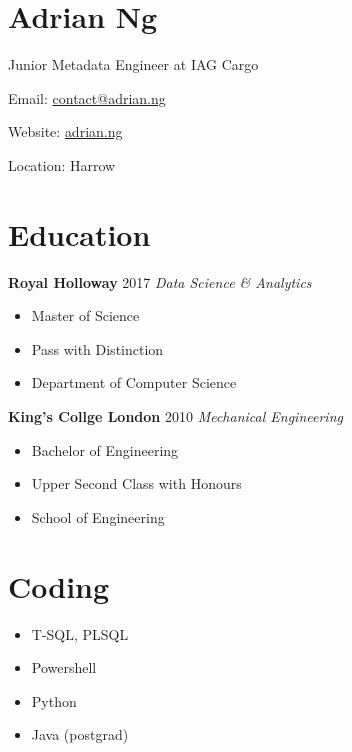 \documentclass[../cv.tex]{subfiles}
\begin{document}
\section{Adrian Ng}
Junior Metadata Engineer at IAG Cargo
\hfill
\begin{description*}
	\item[Email:] \href{mailto:contact@adrian.ng}{contact@adrian.ng}
	\item[Website:] \href{https://adrian.ng}{adrian.ng}
	\item[Location:] Harrow
\end{description*}
\hfill
\vspace{0.25cm}
\noindent
\newline
\begin{minipage}[t]{0.6\linewidth}
	\section{Education}
	\begin{minipage}[t]{0.5\linewidth}
		\textbf{Royal Holloway} \hfill 2017
		\newline
		\textit{Data Science \& Analytics}
		\begin{itemize}[leftmargin=*, itemsep=0.1em]
			\item	Master of Science
			\item	Pass with Distinction
			\item 	Department of Computer Science
		\end{itemize}
	\end{minipage}
	\hspace{0.2em}
	\begin{minipage}[t]{0.5\linewidth}
		\textbf{King's Collge London} \hfill 2010
		\newline
		\textit{Mechanical Engineering}
		\begin{itemize}[leftmargin=*, itemsep=0.1em]
			\item Bachelor of Engineering
			\item Upper Second Class with Honours
			\item School of Engineering
		\end{itemize}
	\end{minipage}
\end{minipage}
\hspace{0.2cm}
\begin{minipage}[t]{0.15\linewidth}
	\section{Coding}
	\begin{itemize}[leftmargin=*]
		\item T-SQL, PLSQL
		\item Powershell	
		\item Python
		\item Java (postgrad)
	\end{itemize}
\end{minipage}
\end{document}
